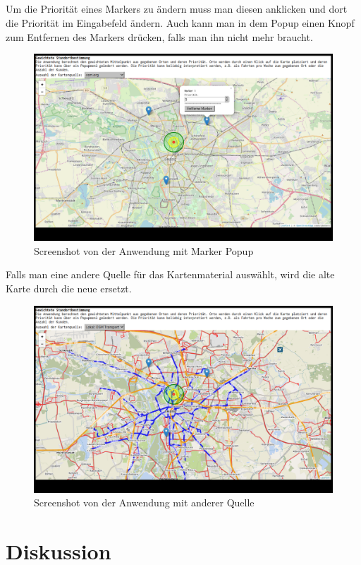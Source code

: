 \documentclass[a4paper, 12pt]{scrreprt}
\begin{document}
\\\\\\\\
Um die Priorität eines Markers zu ändern muss man diesen anklicken und dort die Priorität im Eingabefeld ändern. Auch kann man in dem Popup einen Knopf zum Entfernen des Markers drücken, falls man ihn nicht mehr braucht.\\
\begin{figure}[h]
\includegraphics[width=\linewidth]{bell3_1.png}\caption{Screenshot von der Anwendung mit Marker Popup}
\end{figure}
Falls man eine andere Quelle für das Kartenmaterial auswählt, wird die alte Karte durch die neue ersetzt.
\begin{figure}
\includegraphics[width=\linewidth]{bell4_1.png}
\caption{Screenshot von der Anwendung mit anderer Quelle}
\end{figure}
\chapter{Diskussion}
\end{document}
